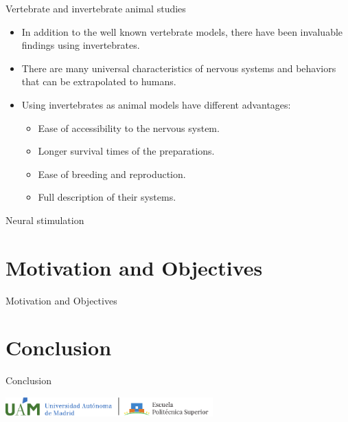 \documentclass[aspectratio=43]{beamer}
\begin{document}
\begin{frame}{Vertebrate and invertebrate animal studies}
	\begin{itemize}
	\item<1->In addition to the well known vertebrate models, there have been invaluable findings using invertebrates.
	\item<2->There are many universal characteristics of nervous systems and behaviors that can be extrapolated to humans.
	\item<3->Using invertebrates as animal models have different advantages:
		\begin{itemize}
			\item<4->Ease of accessibility to the nervous system.
			\item<5-> Longer survival times of the preparations.
			\item<6-> Ease of breeding and reproduction. 
			\item<7-> Full description of their systems. 
		\end{itemize}
	\end{itemize}
	
\end{frame}
\begin{frame}{Neural stimulation}
	
\end{frame}

\section{Motivation and Objectives}
\begin{frame}{Motivation and Objectives}
\end{frame}

\section{Conclusion}

    \begin{frame}{Conclusion}
    \end{frame}
\begin{frame}[plain,t]
\vspace{100pt}
\centering
\includegraphics[width=0.6\textwidth]{logos/UAM+EPS_L-eps-converted-to.pdf}
\end{frame}
\end{document}
